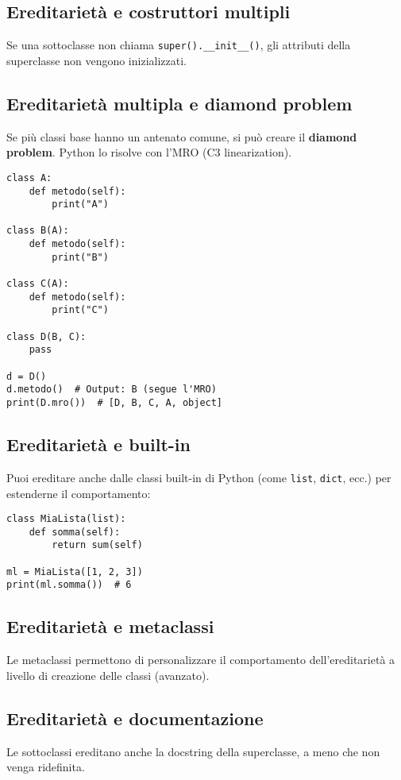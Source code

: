 \documentclass[a4paper,12pt]{article}
\begin{document}
\subsection*{Ereditarietà e costruttori multipli}
Se una sottoclasse non chiama \verb|super().__init__()|, gli attributi della superclasse non vengono inizializzati.

\subsection*{Ereditarietà multipla e diamond problem}
Se più classi base hanno un antenato comune, si può creare il \textbf{diamond problem}. Python lo risolve con l'MRO (C3 linearization).

\begin{lstlisting}
class A:
    def metodo(self):
        print("A")

class B(A):
    def metodo(self):
        print("B")

class C(A):
    def metodo(self):
        print("C")

class D(B, C):
    pass

d = D()
d.metodo()  # Output: B (segue l'MRO)
print(D.mro())  # [D, B, C, A, object]
\end{lstlisting}

\subsection*{Ereditarietà e built-in}
Puoi ereditare anche dalle classi built-in di Python (come \texttt{list}, \texttt{dict}, ecc.) per estenderne il comportamento:
\begin{lstlisting}
class MiaLista(list):
    def somma(self):
        return sum(self)

ml = MiaLista([1, 2, 3])
print(ml.somma())  # 6
\end{lstlisting}

\subsection*{Ereditarietà e metaclassi}
Le metaclassi permettono di personalizzare il comportamento dell'ereditarietà a livello di creazione delle classi (avanzato).

\subsection*{Ereditarietà e documentazione}
Le sottoclassi ereditano anche la docstring della superclasse, a meno che non venga ridefinita.
\end{document}
